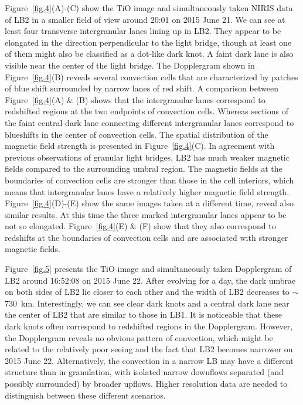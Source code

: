 \documentclass[preprint2]{aastex}
\begin{document}
\begin{figure*}
 \caption{(A)-(C) LB2 seen in images of TiO (in arbitrary units), Doppler shift and magnetic field strength around 20:01 UT on 2015 June 21. The contours indicate the Doppler velocity level of 0.1 km/s. The red arrows indicate four examples of intergranular lanes. The yellow arrows point to sections of the faint central dark lane.  (D)-(F) Same as (A)-(C) but around 20:15 UT on 2015 June 21.}\label{fig.4}
\end{figure*}


Figure~\ref{fig.4}(A)-(C) show the TiO image and simultaneously taken NIRIS data of LB2 in a smaller field of view around 20:01 on 2015 June 21. We can see at least four transverse intergranular lanes lining up in LB2. They appear to be elongated in the direction perpendicular to the light bridge, though at least one of them might also be classified as a dot-like dark knot. A faint dark lane is also visible near the center of the light bridge. The Dopplergram shown in Figure~\ref{fig.4}(B) reveals several convection cells that are characterized by patches of blue shift surrounded by narrow lanes of red shift. A comparison between Figure~\ref{fig.4}(A) \& (B) shows that the intergranular lanes correspond to redshifted regions at the two endpoints of convection cells. Whereas sections of the faint central dark lane connecting different intergranular lanes correspond to blueshifts in the center of convection cells. The spatial distribution of the magnetic field strength is presented in Figure~\ref{fig.4}(C). In agreement with previous observations of granular light bridges, LB2 has much weaker magnetic fields compared to the surrounding umbral region. The magnetic fields at the boundaries of convection cells are stronger than those in the cell interiors, which means that intergranular lanes have a relatively higher magnetic field strength. Figure~\ref{fig.4}(D)-(E) show the same images taken at a different time, reveal also similar results. At this time the three marked intergranular lanes appear to be not so elongated. Figure~\ref{fig.4}(E) \& (F) show that they also correspond to redshifts at the boundaries of convection cells and are associated with stronger magnetic fields.

Figure~\ref{fig.5} presents the TiO image and simultaneously taken Dopplergram of LB2 around 16:52:08 on 2015 June 22. After evolving for a day, the dark umbrae on both sides of LB2 lie closer to each other and the width of LB2 decreases to $\sim$730~km. Interestingly, we can see clear dark knots and a central dark lane near the center of LB2 that are similar to those in LB1. It is noticeable that these dark knots often correspond to redshifted regions in the Dopplergram. However, the Dopplergram reveals no obvious pattern of convection, which might be related to the relatively poor seeing and the fact that LB2 becomes narrower on 2015 June 22. Alternatively, the convection in a narrow LB may have a different structure than in granulation, with isolated narrow downflows separated (and possibly surrounded) by broader upflows. Higher resolution data are needed to distinguish between these different scenarios.
\end{document}

